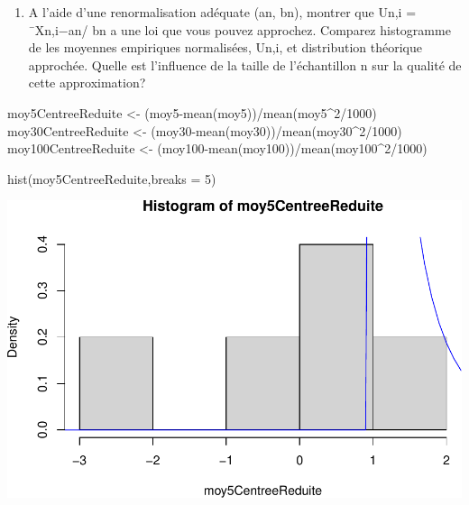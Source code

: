 \documentclass[
]{article}
\newenvironment{Shaded}{\begin{snugshade}}{\end{snugshade}}
\newcommand{\AttributeTok}[1]{\textcolor[rgb]{0.77,0.63,0.00}{#1}}
\newcommand{\DecValTok}[1]{\textcolor[rgb]{0.00,0.00,0.81}{#1}}
\newcommand{\FunctionTok}[1]{\textcolor[rgb]{0.00,0.00,0.00}{#1}}
\newcommand{\NormalTok}[1]{#1}
\newcommand{\OtherTok}[1]{\textcolor[rgb]{0.56,0.35,0.01}{#1}}
\newcommand{\SpecialCharTok}[1]{\textcolor[rgb]{0.00,0.00,0.00}{#1}}
\providecommand{\tightlist}{%
  \setlength{\itemsep}{0pt}\setlength{\parskip}{0pt}}
\begin{document}
\begin{enumerate}
\def\labelenumi{\arabic{enumi}.}
\setcounter{enumi}{3}
\tightlist
\item
  A l'aide d'une renormalisation adéquate (an, bn), montrer que Un,i =
  ¯Xn,i−an/ bn a une loi que vous pouvez approchez. Comparez histogramme
  de les moyennes empiriques normalisées, Un,i, et distribution
  théorique approchée. Quelle est l'influence de la taille de
  l'échantillon n sur la qualité de cette approximation?
\end{enumerate}

\begin{Shaded}
\begin{Highlighting}[]
\NormalTok{moy5CentreeReduite }\OtherTok{\textless{}{-}}\NormalTok{ (moy5}\SpecialCharTok{{-}}\FunctionTok{mean}\NormalTok{(moy5))}\SpecialCharTok{/}\FunctionTok{mean}\NormalTok{(moy5}\SpecialCharTok{\^{}}\DecValTok{2}\SpecialCharTok{/}\DecValTok{1000}\NormalTok{)}
\NormalTok{moy30CentreeReduite }\OtherTok{\textless{}{-}}\NormalTok{ (moy30}\SpecialCharTok{{-}}\FunctionTok{mean}\NormalTok{(moy30))}\SpecialCharTok{/}\FunctionTok{mean}\NormalTok{(moy30}\SpecialCharTok{\^{}}\DecValTok{2}\SpecialCharTok{/}\DecValTok{1000}\NormalTok{)}
\NormalTok{moy100CentreeReduite }\OtherTok{\textless{}{-}}\NormalTok{ (moy100}\SpecialCharTok{{-}}\FunctionTok{mean}\NormalTok{(moy100))}\SpecialCharTok{/}\FunctionTok{mean}\NormalTok{(moy100}\SpecialCharTok{\^{}}\DecValTok{2}\SpecialCharTok{/}\DecValTok{1000}\NormalTok{)}

\FunctionTok{hist}\NormalTok{(moy5CentreeReduite,}\AttributeTok{breaks =} \DecValTok{5}\NormalTok{)}
\end{Highlighting}
\end{Shaded}

\includegraphics{tp2_files/figure-latex/normalisation-1.pdf}
\end{document}
